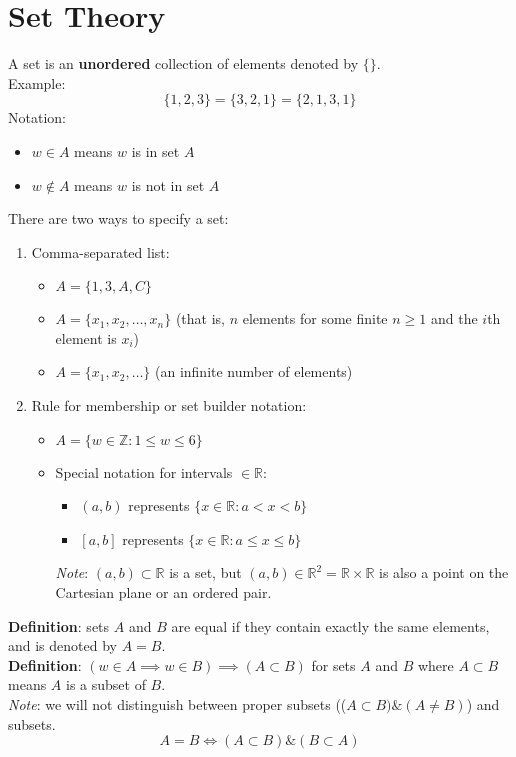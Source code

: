 \documentclass[nobib]{tufte-handout}
\begin{document}
\section{Set Theory}
A set is an \textbf{unordered} collection of elements denoted by $\{ \}$.\\
Example:
\begin{equation*}
    \{1,2,3\} = \{3,2,1\} = \{2,1,3,1\}
\end{equation*}
Notation:
\begin{itemize}
    \item $w \in A$ means $w$ is in set $A$
    \item $w \not\in A$ means $w$ is not in set $A$
\end{itemize}
There are two ways to specify a set:
\begin{enumerate}
    \item Comma-separated list:
    \begin{itemize}
        \item $A = \{1,3,A,C\}$
        \item $A = \{ x_1, x_2, \ldots, x_n\}$ (that is, $n$ elements for some finite $n \geq 1$ and the $i$th element is $x_i$)
        \item $A = \{x_1,x_2, \ldots\}$ (an infinite number of elements)
    \end{itemize}
    \item  Rule for membership or set builder notation:
    \begin{itemize}
        \item $A = \{w \in \mathbb{Z} : 1\leq w \leq 6\}$
        \item Special notation for intervals $\in \mathbb{R}$:
        \begin{itemize}
            \item $(a,b)$ represents $\{x \in \mathbb{R}: a < x < b\}$
            \item $[a,b]$ represents $\{x \in \mathbb{R}: a \leq x \leq b\}$
        \end{itemize}
        \textit{Note}: $(a,b) \subset \mathbb{R}$ is a set, but $(a,b) \in \mathbb{R}^2 = \mathbb{R} \times \mathbb{R}$ is also a point on the Cartesian plane or an ordered pair.
    \end{itemize}
\end{enumerate}
\textbf{Definition}: sets $A$ and $B$ are equal if they contain exactly the same elements, and is denoted by $A=B$.\\
\textbf{Definition}: $(w\in A \implies w\in B)\implies (A \subset B)$ for sets $A$ and $B$ where $A \subset B$ means $A$ is a subset of $B$.\\
\textit{Note}: we will not distinguish between proper subsets (($A\subset B) \&( A \neq B)$) and subsets.
\begin{equation*}
    A = B \iff (A \subset B) \& (B \subset A)
\end{equation*}
\end{document}
